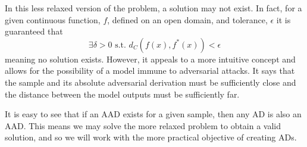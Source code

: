 \noindent
In this less relaxed version of the problem, a solution may not exist.  In fact, for a given continuous function, $f$, defined on an open domain, and tolerance, $\epsilon$ it is guaranteed that $$\exists \delta > 0 \text{ s.t. } d_C(f(x),f^*(x)) < \epsilon$$ meaning no solution exists.  However, it appeals to a more intuitive concept and allows for the possibility of a model immune to adversarial attacks.  It says that the sample and its absolute adversarial derivation must be sufficiently close and the distance between the model outputs must be sufficiently far.  

It is easy to see that if an AAD exists for a given sample, then any AD is also an AAD.  This means we may solve the more relaxed problem to obtain a valid solution, and so we will work with the more practical objective of creating ADs.
